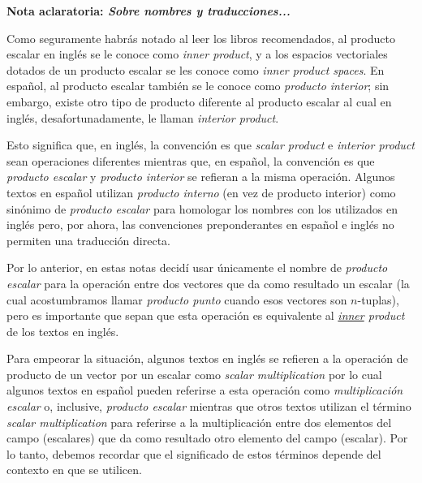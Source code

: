 \documentclass[12pt,dvipsnames]{article}
\begin{document}
\begin{tcolorbox}
\begin{center}
    \textbf{Nota aclaratoria: \emph{Sobre nombres y traducciones...}}
\end{center}

\hspace{2.5mm}Como seguramente habrás notado al leer los libros recomendados, al producto escalar en inglés se le conoce como \emph{inner product}, y a los espacios vectoriales dotados de un producto escalar se les conoce como \emph{inner product spaces}. En español, al producto escalar también se le conoce como \emph{producto interior}; sin embargo, existe otro tipo de producto diferente al producto escalar al cual en inglés, desafortunadamente, le llaman \emph{interior product}.

\vspace{5mm}
\hspace{2.5mm}Esto significa que, en inglés, la convención es que \emph{scalar product} e \emph{interior product} sean operaciones diferentes mientras que, en español, la convención es que \emph{producto escalar} y \emph{producto interior} se refieran a la misma operación. Algunos textos en español utilizan \emph{producto interno} (en vez de producto interior) como sinónimo de \emph{producto escalar} para homologar los nombres con los utilizados en inglés pero, por ahora, las convenciones preponderantes en español e inglés no permiten una traducción directa.

\vspace{5mm}
\hspace{2.5mm}Por lo anterior, en estas notas decidí usar únicamente el nombre de \emph{producto escalar} para la operación entre dos vectores que da como resultado un escalar (la cual acostumbramos llamar \emph{producto punto} cuando esos vectores son $n$-tuplas), pero es importante que sepan que esta operación es equivalente al \emph{\underline{inner} product} de los textos en inglés.

\vspace{5mm}
\hspace{2.5mm} Para empeorar la situación, algunos textos en inglés se refieren a la operación de producto de un vector por un escalar como \emph{scalar multiplication} \textemdash por lo cual algunos textos en español pueden referirse a esta operación como \emph{multiplicación escalar} o, inclusive, \emph{producto escalar}\textemdash \hspace{0.5mm} mientras que otros textos utilizan el término \emph{scalar multiplication} para referirse a la multiplicación entre dos elementos del campo (escalares) que da como resultado otro elemento del campo (escalar). Por lo tanto, debemos recordar que el significado de estos términos depende del contexto en que se utilicen. 


\end{tcolorbox}
\end{document}
